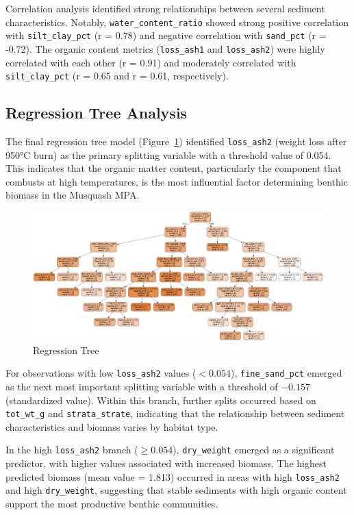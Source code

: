 \documentclass[12pt]{article}
\begin{document}
\qquad Correlation analysis identified strong relationships between several
sediment characteristics. Notably, \texttt{water\_content\_ratio} showed strong
positive correlation with \texttt{silt\_clay\_pct} (r = 0.78) and negative
correlation with \texttt{sand\_pct} (r = -0.72). The organic content metrics
(\texttt{loss\_ash1} and \texttt{loss\_ash2}) were highly correlated with each
other (r = 0.91) and moderately correlated with \texttt{silt\_clay\_pct} (r =
0.65 and r = 0.61, respectively).

\subsection{Regression Tree Analysis}

The final regression tree model (Figure~\ref{fig:regression-tree}) identified
\texttt{loss\_ash2} (weight loss after 950°C burn) as the primary splitting
variable with a threshold value of 0.054. This indicates that the organic matter
content, particularly the component that combusts at high temperatures, is the
most influential factor determining benthic biomass in the Musquash MPA.

\begin{figure}[H]
\centering
\includegraphics[scale=1]{Regression-tree}
\caption{Regression Tree}
\label{fig:regression-tree}
\end{figure}

\qquad For observations with low \texttt{loss\_ash2} values ($<0.054$),
\texttt{fine\_sand\_pct} emerged as the next most important splitting variable
with a threshold of $-0.157$ (standardized value). Within this branch, further
splits occurred based on \texttt{tot\_wt\_g} and \texttt{strata\_strate},
indicating that the relationship between sediment characteristics and biomass
varies by habitat type.

\qquad In the high \texttt{loss\_ash2} branch ($\geq0.054$),
\texttt{dry\_weight} emerged as a significant predictor, with higher values
associated with increased biomass. The highest predicted biomass (mean value =
1.813) occurred in areas with high \texttt{loss\_ash2} and high
\texttt{dry\_weight}, suggesting that stable sediments with high organic content
support the most productive benthic communities.
\end{document}
